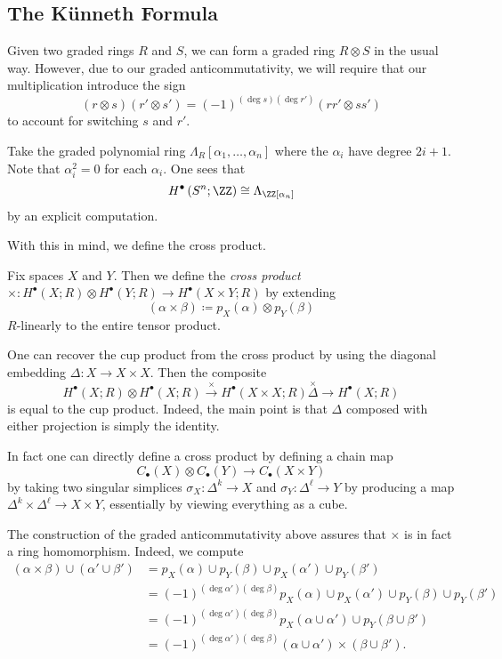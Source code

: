 \documentclass[../notes.tex]{subfiles}
\begin{document}
\subsection{The K\"unneth Formula}
Given two graded rings $R$ and $S$, we can form a graded ring $R\otimes S$ in the usual way. However, due to our graded anticommutativity, we will require that our multiplication introduce the sign
\[(r\otimes s)(r'\otimes s')=(-1)^{(\deg s)(\deg r')}(rr'\otimes ss')\]
to account for switching $s$ and $r'$.
\begin{example}
	Take the graded polynomial ring $\Lambda_R[\alpha_1,\ldots,\alpha_n]$ where the $\alpha_i$ have degree $2i+1$. Note that $\alpha_i^2=0$ for each $\alpha_i$. One sees that
	\[H^\bullet\left(S^n;\ZZ\right)\cong\Lambda_\ZZ[\alpha_n]\]
	by an explicit computation.
\end{example}
With this in mind, we define the cross product.
\begin{definition}
	Fix spaces $X$ and $Y$. Then we define the \textit{cross product} $\times\colon H^\bullet(X;R)\otimes H^\bullet(Y;R)\to H^\bullet(X\times Y;R)$ by extending
	\[(\alpha\times\beta)\coloneqq p_X(\alpha)\otimes p_Y(\beta)\]
	$R$-linearly to the entire tensor product.
\end{definition}
\begin{remark}
	One can recover the cup product from the cross product by using the diagonal embedding $\Delta\colon X\to X\times X$. Then the composite
	\[H^\bullet(X;R)\otimes H^\bullet(X;R)\stackrel\times\to H^\bullet(X\times X;R)\stackrel\times\Delta\to H^\bullet(X;R)\]
	is equal to the cup product. Indeed, the main point is that $\Delta$ composed with either projection is simply the identity.
\end{remark}
\begin{remark}
	In fact one can directly define a cross product by defining a chain map
	\[C_\bullet(X)\otimes C_\bullet(Y)\to C_\bullet(X\times Y)\]
	by taking two singular simplices $\sigma_X\colon\Delta^k\to X$ and $\sigma_Y\colon\Delta^\ell\to Y$ by producing a map $\Delta^k\times\Delta^\ell\to X\times Y$, essentially by viewing everything as a cube.
\end{remark}
The construction of the graded anticommutativity above assures that $\times$ is in fact a ring homomorphism. Indeed, we compute
\begin{align*}
	(\alpha\times\beta)\cup(\alpha'\cup\beta') &= p_X(\alpha)\cup p_Y(\beta)\cup p_X(\alpha')\cup p_Y(\beta') \\
	&= (-1)^{(\deg\alpha')(\deg\beta)}p_X(\alpha)\cup p_X(\alpha')\cup p_Y(\beta)\cup p_Y(\beta') \\
	&= (-1)^{(\deg\alpha')(\deg\beta)}p_X(\alpha\cup\alpha')\cup p_Y(\beta\cup\beta') \\
	&= (-1)^{(\deg\alpha')(\deg\beta)}(\alpha\cup\alpha')\times(\beta\cup\beta').
\end{align*}
\end{document}
